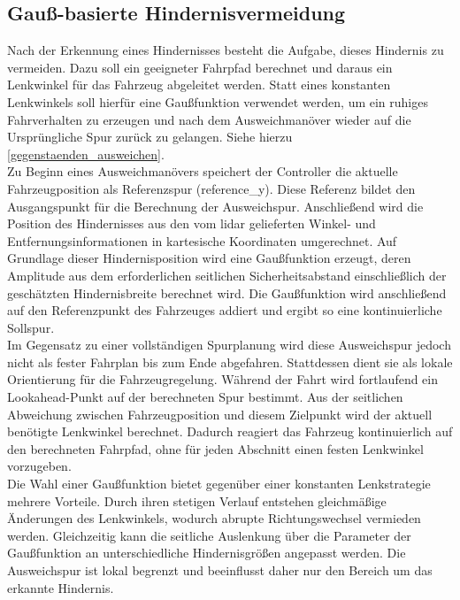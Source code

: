 \subsection{Gauß-basierte Hindernisvermeidung}
Nach der Erkennung eines Hindernisses besteht die Aufgabe, dieses Hindernis zu vermeiden. Dazu soll ein geeigneter Fahrpfad berechnet und daraus ein Lenkwinkel für das Fahrzeug abgeleitet werden. Statt eines konstanten Lenkwinkels soll hierfür eine Gaußfunktion verwendet werden, um ein ruhiges Fahrverhalten zu erzeugen und nach dem Ausweichmanöver wieder auf die Ursprüngliche Spur zurück zu gelangen. Siehe hierzu \ref{gegenstaenden_ausweichen}.
\\
Zu Beginn eines Ausweichmanövers speichert der Controller die aktuelle Fahrzeugposition als Referenzspur (reference\_y). Diese Referenz bildet den Ausgangspunkt für die Berechnung der Ausweichspur. Anschließend wird die Position des Hindernisses aus den vom \gls{lidar} gelieferten Winkel- und Entfernungsinformationen in kartesische Koordinaten umgerechnet. Auf Grundlage dieser Hindernisposition wird eine Gaußfunktion erzeugt, deren Amplitude aus dem erforderlichen seitlichen Sicherheitsabstand einschließlich der geschätzten Hindernisbreite berechnet wird. Die Gaußfunktion wird anschließend auf den Referenzpunkt des Fahrzeuges addiert und ergibt so eine kontinuierliche Sollspur.
\\
Im Gegensatz zu einer vollständigen Spurplanung wird diese Ausweichspur jedoch nicht als fester Fahrplan bis zum Ende abgefahren. Stattdessen dient sie als lokale Orientierung für die Fahrzeugregelung. Während der Fahrt wird fortlaufend ein Lookahead-Punkt auf der berechneten Spur bestimmt. Aus der seitlichen Abweichung zwischen Fahrzeugposition und diesem Zielpunkt wird der aktuell benötigte Lenkwinkel berechnet. Dadurch reagiert das Fahrzeug kontinuierlich auf den berechneten Fahrpfad, ohne für jeden Abschnitt einen festen Lenkwinkel vorzugeben.
\\
Die Wahl einer Gaußfunktion bietet gegenüber einer konstanten Lenkstrategie mehrere Vorteile. Durch ihren stetigen Verlauf entstehen gleichmäßige Änderungen des Lenkwinkels, wodurch abrupte Richtungswechsel vermieden werden. Gleichzeitig kann die seitliche Auslenkung über die Parameter der Gaußfunktion an unterschiedliche Hindernisgrößen angepasst werden. Die Ausweichspur ist lokal begrenzt und beeinflusst daher nur den Bereich um das erkannte Hindernis.
\\
